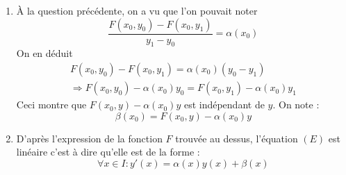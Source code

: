 \begin{enumerate}
\begin{enumerate}
 \item \`A la question précédente, on a vu que l'on pouvait noter 
\begin{displaymath}
 \frac{F(x_0,y_0)-F(x_0,y_1)}{y_1-y_0} = \alpha(x_0)
\end{displaymath}
On en déduit
\begin{multline*}
 F(x_0,y_0)-F(x_0,y_1)= \alpha(x_0)(y_0 - y_1) \\
\Rightarrow
F(x_0,y_0) -\alpha(x_0)y_0 = F(x_0,y_1) -\alpha(x_0)y_1 
\end{multline*}
Ceci montre que $F(x_0,y)-\alpha(x_0)y$ est indépendant de $y$. On note :
\begin{displaymath}
 \beta(x_0) = F(x_0,y)-\alpha(x_0)y
\end{displaymath}

 \item D'après l'expression de la fonction $F$ trouvée au dessus,  l'équation $(E)$ est linéaire c'est à dire qu'elle est de la forme :
\begin{displaymath}
 \forall x\in I : y'(x) = \alpha(x)y(x) + \beta(x)
\end{displaymath}

\end{enumerate}

\end{enumerate}
